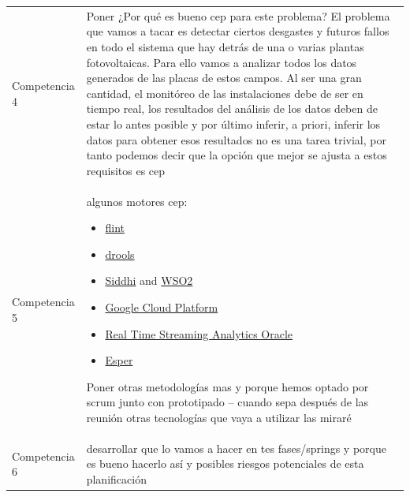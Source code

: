 \documentclass[a4paper]{article}
\begin{document}
\begin{center}
\begin{supertabular}{m{5.605cm}m{10.849cm}}
    {\color{black} Competencia 4} &
    {\color{black} Poner ¿Por qué es bueno cep para este problema?
    El problema que vamos a tacar es detectar ciertos desgastes y futuros fallos en todo el sistema que hay detrás de una o varias plantas fotovoltaicas. Para ello vamos a analizar todos los datos generados de las placas de estos campos. Al ser una gran cantidad, el monitóreo de las instalaciones debe de ser en tiempo real, los resultados del análisis de los datos deben de estar lo antes posible y por último inferir, a priori, inferir los datos para obtener esos resultados no es una tarea trivial, por tanto podemos decir que la opción que mejor se ajusta a estos requisitos es cep}\\
    
    {\color{black} Competencia 5} &
    {\color{black} algunos motores cep: 
      \begin{itemize}
        \item \href{https://flink.apache.org/index.html}{flint}
        \item \href{https://docs.jboss.org/drools/release/6.2.0.CR3/drools-docs/html/DroolsComplexEventProcessingChapter.html}{drools}
        \item \href{https://github.com/wso2/siddhi
    y https://wso2.com/products/complex-event-processor/}{Siddhi} and \href{https://wso2.com/products/complex-event-processor/}{WSO2}
        \item \href{https://cloud.google.com/solutions/architecture/complex-event-processing}{Google Cloud Platform}
        \item \href{http://www.oracle.com/technetwork/middleware/complex-event-processing/documentation/index.html}{Real Time Streaming Analytics Oracle}
        \item \href{http://www.espertech.com/esper/}{Esper}
      \end{itemize}
      Poner otras metodologías mas y porque hemos optado por scrum junto con prototipado
      -- cuando sepa después de las reunión otras tecnologías que vaya a utilizar las miraré
   	}\\
    
    {\color{black} Competencia 6} &
    {\color{black} desarrollar que lo vamos a hacer en tes fases/springs y porque es bueno hacerlo así y posibles riesgos potenciales de esta planificación}\\

\end{supertabular}
\end{center}
\bigskip
\end{document}

